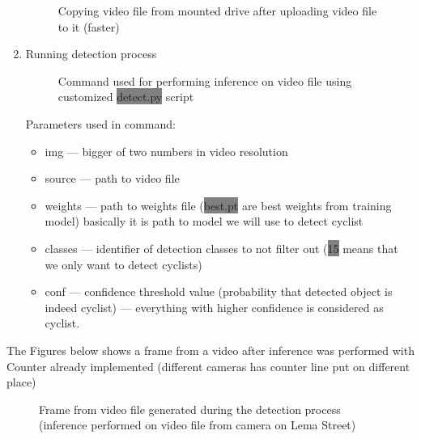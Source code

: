 \begin{enumerate}
\begin{figure} [H]
        \caption{Copying video file from mounted drive after uploading video file to it (faster)}
        \label{fig:inference3}
    \end{figure}
    \item Running detection process
    \newline \begin{figure} [H]
        \centering
        \caption{Command used for performing inference on video file using customized \colorbox{Gray}{detect.py} script}
        \label{fig:inference4}
    \end{figure}
    Parameters used in command:
    \begin{itemize}
        \item img --- bigger of two numbers in video resolution
        \item source --- path to video file
        \item weights --- path to weights file (\colorbox{Gray}{best.pt} are best weights from training model) basically it is path to model we will use to detect cyclist
        \item classes --- identifier of detection classes to not filter out (\colorbox{Gray}{15} means that we only want to detect cyclists)
        \item conf --- confidence threshold value (probability that detected object is indeed cyclist) --- everything with higher confidence is considered as cyclist.
    \end{itemize}
\end{enumerate}
The Figures below shows a frame from a video after inference was performed with Counter already implemented (different cameras has counter line put on different place)
\begin{figure} [H]
    \centering
    \caption{Frame from video file generated during the detection process (inference performed on video file from camera on Lema Street)}
    \label{fig:inference}
\end{figure}
